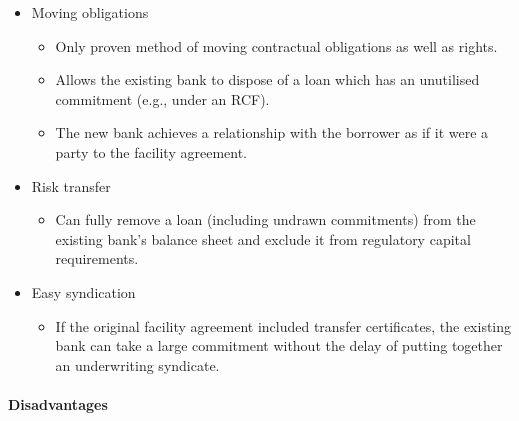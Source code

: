 \documentclass[
]{article}
\providecommand{\tightlist}{%
  \setlength{\itemsep}{0pt}\setlength{\parskip}{0pt}}
\begin{document}
\begin{itemize}
\tightlist
\item
  Moving obligations

  \begin{itemize}
  \tightlist
  \item
    Only proven method of moving contractual obligations as well as
    rights.
  \item
    Allows the existing bank to dispose of a loan which has an
    unutilised commitment (e.g., under an RCF).
  \item
    The new bank achieves a relationship with the borrower as if it were
    a party to the facility agreement.
  \end{itemize}
\item
  Risk transfer

  \begin{itemize}
  \tightlist
  \item
    Can fully remove a loan (including undrawn commitments) from the
    existing bank's balance sheet and exclude it from regulatory capital
    requirements.
  \end{itemize}
\item
  Easy syndication

  \begin{itemize}
  \tightlist
  \item
    If the original facility agreement included transfer certificates,
    the existing bank can take a large commitment without the delay of
    putting together an underwriting syndicate.
  \end{itemize}
\end{itemize}

\hypertarget{disadvantages}{%
\paragraph{Disadvantages}\label{disadvantages}}
\end{document}
